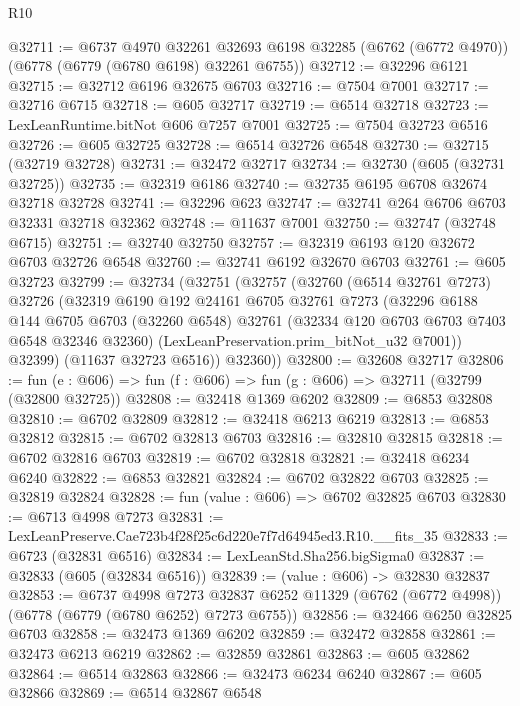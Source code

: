 \begin{lexlean}{R10}
\begin{coremodule}
@32711 := @6737
    @4970
    @32261
    @32693
    @6198
    @32285
    (@6762 (@6772 @4970))
    (@6778 (@6779 (@6780 @6198) @32261 @6755))
@32712 := @32296 @6121
@32715 := @32712 @6196 @32675 @6703
@32716 := @7504 @7001
@32717 := @32716 @6715
@32718 := @605 @32717
@32719 := @6514 @32718
@32723 := LexLeanRuntime.bitNot @606 @7257 @7001
@32725 := @7504 @32723 @6516
@32726 := @605 @32725
@32728 := @6514 @32726 @6548
@32730 := @32715 (@32719 @32728)
@32731 := @32472 @32717
@32734 := @32730 (@605 (@32731 @32725))
@32735 := @32319 @6186
@32740 := @32735 @6195 @6708 @32674 @32718 @32728
@32741 := @32296 @623
@32747 := @32741 @264 @6706 @6703 @32331 @32718 @32362
@32748 := @11637 @7001
@32750 := @32747 (@32748 @6715)
@32751 := @32740 @32750
@32757 := @32319 @6193 @120 @32672 @6703 @32726 @6548
@32760 := @32741 @6192 @32670 @6703
@32761 := @605 @32723
@32799 := @32734
    (@32751
      (@32757
        (@32760
          (@6514 @32761 @7273)
          @32726
          (@32319
            @6190
            @192
            @24161
            @6705
            @32761
            @7273
            (@32296
              @6188
              @144
              @6705
              @6703
              (@32260 @6548)
              @32761
              (@32334 @120 @6703 @6703 @7403 @6548 @32346 @32360)
              (LexLeanPreservation.prim_bitNot_u32 @7001))
            @32399)
          (@11637 @32723 @6516))
        @32360))
@32800 := @32608 @32717
@32806 := fun (e : @606) => fun (f : @606) => fun (g : @606) => @32711 (@32799 (@32800 @32725))
@32808 := @32418 @1369 @6202
@32809 := @6853 @32808
@32810 := @6702 @32809
@32812 := @32418 @6213 @6219
@32813 := @6853 @32812
@32815 := @6702 @32813 @6703
@32816 := @32810 @32815
@32818 := @6702 @32816 @6703
@32819 := @6702 @32818
@32821 := @32418 @6234 @6240
@32822 := @6853 @32821
@32824 := @6702 @32822 @6703
@32825 := @32819 @32824
@32828 := fun (value : @606) => @6702 @32825 @6703
@32830 := @6713 @4998 @7273
@32831 := LexLeanPreserve.Cae723b4f28f25c6d220e7f7d64945ed3.R10.__fits_35
@32833 := @6723 (@32831 @6516)
@32834 := LexLeanStd.Sha256.bigSigma0
@32837 := @32833 (@605 (@32834 @6516))
@32839 := (value : @606) -> @32830 @32837
@32853 := @6737
    @4998
    @7273
    @32837
    @6252
    @11329
    (@6762 (@6772 @4998))
    (@6778 (@6779 (@6780 @6252) @7273 @6755))
@32856 := @32466 @6250 @32825 @6703
@32858 := @32473 @1369 @6202
@32859 := @32472 @32858
@32861 := @32473 @6213 @6219
@32862 := @32859 @32861
@32863 := @605 @32862
@32864 := @6514 @32863
@32866 := @32473 @6234 @6240
@32867 := @605 @32866
@32869 := @6514 @32867 @6548

\end{coremodule}
\end{lexlean}
